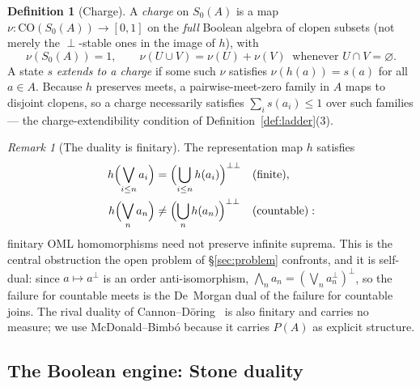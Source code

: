 \documentclass[11pt,reqno]{amsart}
\theoremstyle{plain}
\theoremstyle{definition}
\newtheorem{definition}[theorem]{Definition}
\theoremstyle{remark}
\newtheorem{remark}[theorem]{Remark}
\newcommand{\CO}{\mathrm{CO}}
\begin{document}
\begin{definition}[Charge]\label{def:charge}
A \emph{charge} on $S_0(A)$ is a map $\nu : \CO(S_0(A)) \to [0,1]$ on the
\emph{full} Boolean algebra of clopen subsets (not merely the $\perp$-stable
ones in the image of $h$), with
\[
  \nu(S_0(A))=1,
  \qquad
  \nu(U\cup V)=\nu(U)+\nu(V) \ \text{ whenever } U\cap V=\varnothing.
\]
A state $s$ \emph{extends to a charge} if some such $\nu$ satisfies
$\nu(h(a)) = s(a)$ for all $a \in A$. Because $h$ preserves
meets, a pairwise-meet-zero family in $A$ maps to disjoint clopens, so a
charge necessarily satisfies $\sum_i s(a_i)\le 1$ over such families --- the
charge-extendibility condition of Definition~\ref{def:ladder}(3).
\end{definition}

\begin{remark}[The duality is finitary]\label{rem:finitary}
The representation map $h$ satisfies
\[
  \begin{aligned}
  h\Bigl(\bigvee_{i\leq n} a_i\Bigr)&=\Bigl(\bigcup_{i\leq n} h(a_i)\Bigr)^{\perp\perp}
    && (\text{finite}),\\
  h\Bigl(\bigvee_{n} a_n\Bigr)&\neq\Bigl(\bigcup_{n} h(a_n)\Bigr)^{\perp\perp}
    && (\text{countable}):
  \end{aligned}
\]
finitary OML homomorphisms need not preserve infinite suprema. This is the
central obstruction the open problem of \S\ref{sec:problem} confronts, and it
is self-dual: since $a\mapsto a^\perp$ is an order anti-isomorphism,
$\bigwedge_n a_n=(\bigvee_n a_n^\perp)^\perp$, so the failure for countable
meets is the De~Morgan dual of the failure for countable joins. The rival
duality of Cannon--D\"{o}ring~\cite{Cannon2013} is also finitary and carries no
measure; we use McDonald--Bimb\'{o} because it carries $P(A)$ as explicit
structure.
\end{remark}

\subsection{The Boolean engine: Stone duality}
\label{sec:ls}
\end{document}
